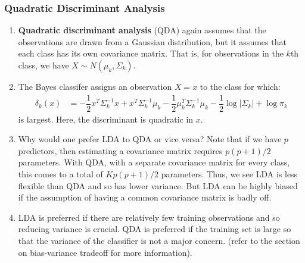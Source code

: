 \documentclass[10pt]{article}
\begin{document}
\subsubsection{Quadratic Discriminant Analysis} 
\begin{enumerate}
	\item \textbf{Quadratic discriminant analysis} (QDA) again assumes that the observations are drawn from a Gaussian distribution, but it assumes that each class has its own covariance matrix.  That is, for observations in the $k$th class, we have $X \sim N(\mu_k, \Sigma_k)$. 
	\item The Bayes classifer assigns an observation $X = x$ to the class for which:
	\begin{align*}
		\delta_k(x) &= - \dfrac{1}{2} x^T \Sigma_k^{-1}x + x^T \Sigma_k^{-1}\mu_k - \dfrac{1}{2} \mu_k^T\Sigma_k^{-1} \mu_k - \dfrac{1}{2} \log|\Sigma_k| + \log \pi_k 
	\end{align*}
	is largest. Here, the discriminant is quadratic in $x$. 
	\item Why would one prefer LDA to QDA or vice versa?  Note that if we have $p$ predictors, then estimating a covariance matrix requires $p(p+1)/2$ parameters.  With QDA, with a separate covariance matrix for every class, this comes to a total of $Kp(p+1)/2$ parameters.  Thus, we see LDA is less flexible than QDA and so has lower variance.  But LDA can be highly biased if the assumption of having a common covariance matrix is badly off.
	\item LDA is preferred if there are relatively few training observations and so reducing variance is crucial.  QDA is preferred if the training set is large so that the variance of the classifier is not a major concern. (refer to the section on bias-variance tradeoff for more information). 
\end{enumerate}
\end{document}

